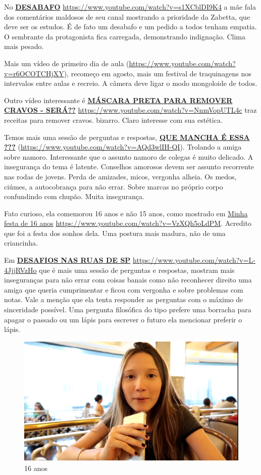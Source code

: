 No \href{https://www.youtube.com/watch?v=s1XCblDI9K4}{\textbf{DESABAFO}} \url{https://www.youtube.com/watch?v=s1XCblDI9K4} a mãe fala dos comentários maldosos de seu canal mostrando a prioridade da Zabetta, que deve ser os estudos. É de fato um desabafo e um pedido a todos tenham empatia. O sembrante da protagonista fica carregada, demonstrando indignação. Clima mais pesado.

Mais um vídeo de primeiro dia de aula (\url{https://www.youtube.com/watch?v=r6OCOTCHjXY}), recomeço em agosto, mais um festival de traquinagens nos intervalos entre aulas e recreio. A câmera deve ligar o modo mongoloide de todos.

Outro vídeo interessante é \href{https://www.youtube.com/watch?v=NnmVopUTL4c}{\textbf{MÁSCARA PRETA PARA REMOVER CRAVOS - SERÁ??}} \url{https://www.youtube.com/watch?v=NnmVopUTL4c} traz receitas para remover cravos. bizarro. Claro interesse com sua estética.

Temos mais uma sessão de perguntas e respostas, \href{https://www.youtube.com/watch?v=AQd3wlIH-QI}{\textbf{QUE MANCHA É ESSA ???}} (\url{https://www.youtube.com/watch?v=AQd3wlIH-QI}). Trolando a amiga sobre namoro. Interessante que o assunto namoro de colegas é muito delicado. A insegurança do tema é latente. Conselhos amorosos devem ser assunto recorrente nas rodas de jovens. Perda de amizades, micos, vergonha alheia. Os medos, ciúmes, a autocobrança para não errar. Sobre marcas no próprio corpo confundindo com chupão. Muita insegurança.

Fato curioso, ela comemorou 16 anos e não 15 anos, como mostrado em \href{https://www.youtube.com/watch?v=VzXQh5oLdPM}{Minha festa de 16 anos} \url{https://www.youtube.com/watch?v=VzXQh5oLdPM}. Acredito que foi a festa dos sonhos dela. Uma postura mais madura, não de uma criancinha.

Em \href{https://www.youtube.com/watch?v=L-4JjjRVzHo}{\textbf{DESAFIOS NAS RUAS DE SP}} \url{https://www.youtube.com/watch?v=L-4JjjRVzHo} que é mais uma sessão de perguntas e respostas, mostram mais inseguranças para não errar com coisas banais como não reconhecer direito uma amiga que queria cumprimentar e ficou com vergonha e sobre problemas com notas. Vale a menção que ela tenta responder as perguntas com o máximo de sinceridade possível. Uma pergunta filosófica do tipo prefere uma borracha para apagar o passado ou um lápis para escrever o futuro ela mencionar preferir o lápis.

\begin{figure}[h!]
    \centering
    \includegraphics[width=0.7\linewidth]{fig/Zabetta-16-anos1}
    \caption{16 anos}
    \label{fig:zabetta-16-anos1}
\end{figure}


